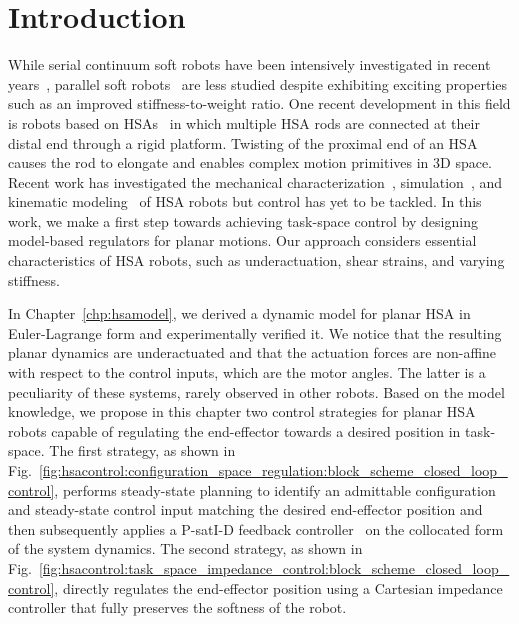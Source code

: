 \section{Introduction}
While serial continuum soft robots have been intensively investigated in recent years~\cite{della2023model}, parallel soft robots~\cite{hughes2020extensible} %
are less studied despite exhibiting exciting properties such as an improved stiffness-to-weight ratio. 
One recent development in this field is robots based on \glspl{HSA}~\cite{truby2021recipe, kaarthik2022motorized, stolzle2024guiding} in which multiple \gls{HSA} rods are connected at their distal end through a rigid platform. 
Twisting of the proximal end of an \gls{HSA} %
causes the rod to elongate 
and enables complex motion primitives in 3D space.
Recent work has investigated 
the mechanical characterization~\cite{good2022expanding}, simulation~\cite{stolzle2023modelling}, and kinematic modeling~\cite{garg2022kinematic, stolzle2023modelling} of \gls{HSA} robots but control has yet to be tackled.
In this work, we make a first step towards achieving task-space control by designing model-based regulators for planar motions. Our approach considers essential characteristics of \gls{HSA} robots, such as underactuation, shear strains, and varying stiffness. %

In Chapter~\ref{chp:hsamodel}, we derived a dynamic model for planar \gls{HSA} in Euler-Lagrange form and experimentally verified it.
We notice that the resulting planar dynamics are underactuated and that the actuation forces are non-affine with respect to the control inputs, which are the motor angles. The latter is a peculiarity of these systems, rarely observed in other robots.
Based on the model knowledge, we propose in this chapter two control strategies for planar \gls{HSA} robots capable of regulating the end-effector towards a desired position in task-space.
The first strategy, as shown in Fig.~\ref{fig:hsacontrol:configuration_space_regulation:block_scheme_closed_loop_control}, performs steady-state planning to identify an admittable configuration and steady-state control input matching the desired end-effector position and then subsequently applies a P-satI-D feedback controller~\cite{pustina2022p} on the collocated form~\cite{pustina2024input} of the system dynamics.
The second strategy, as shown in Fig.~\ref{fig:hsacontrol:task_space_impedance_control:block_scheme_closed_loop_control}, directly regulates the end-effector position using a Cartesian impedance controller that fully preserves the softness of the robot.

